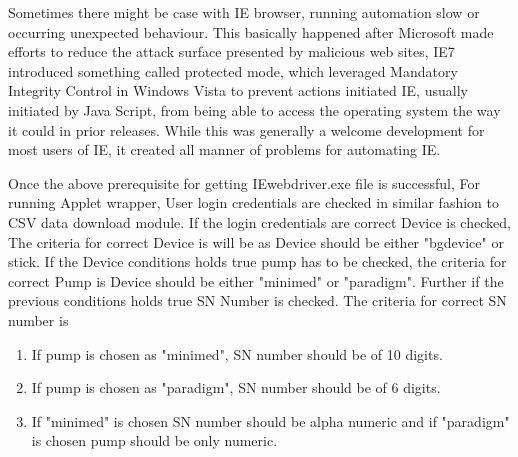 \documentclass[article,type=msc,colorback,accentcolor=tud9c,twoside,11pt]{tudthesis}
\begin{document}
Sometimes there might be case with IE browser, running automation slow or occurring unexpected behaviour. This basically happened after Microsoft made efforts to reduce the attack surface presented by malicious web sites, IE7 introduced something called protected mode, which leveraged Mandatory Integrity Control in Windows Vista to prevent actions initiated IE, usually initiated by Java Script, from being able to access the operating system the way it could in prior releases. While this was generally a welcome development for most users of IE, it created all manner of problems for automating IE.

Once the above prerequisite for getting IEwebdriver.exe file is successful, For running Applet wrapper, User login credentials are checked in similar fashion to CSV data download module. If the login credentials are correct Device is checked, The criteria for correct Device is will be as Device should be either "bgdevice" or stick. If the Device conditions holds true pump has to be checked, the criteria for correct Pump is Device should be either "minimed" or "paradigm".  Further if the previous conditions holds true SN Number is checked. The criteria for correct SN number is
\begin{enumerate}
\item If pump is chosen as "minimed", SN number should  be of 10 digits.
\item  If pump is chosen as "paradigm", SN number should  be of 6 digits.
\item  If "minimed" is chosen SN number should be alpha numeric and if "paradigm" is chosen pump should be only numeric.
\end{enumerate}
\end{document}
